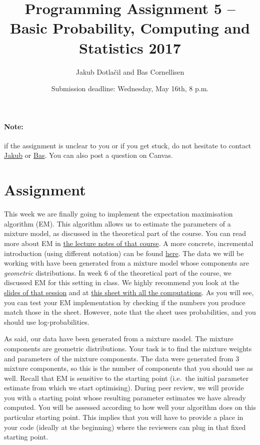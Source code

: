 \documentclass[11pt, a4paper]{article}
\title{Programming Assignment 5 -- Basic Probability, Computing and Statistics 2017}
\author{Jakub Dotla\v{c}il and Bas Cornellisen}
\date{Submission deadline: Wednesday, May 16th, 8 p.m.}
\begin{document}
\maketitle

\paragraph{Note:} if the assignment is unclear to you or if you get stuck, do not hesitate to contact \href{mailto:j.dotlacil@uva.nl}{Jakub} or \href{mailto:bjmcornelissen@gmail.com}{Bas}. You can also post a question on Canvas.

\section{Assignment}

This week we are finally going to implement the expectation maximisation algorithm (EM). 
This algorithm allows us to estimate the parameters of a mixture model, as discussed in the theoretical part of the course.
You can read more about EM in
\href{https://github.com/BasicProbability/LectureNotes/blob/master/chapter6/chapter6.pdf}{the lecture notes of that course}. 
A more concrete, incremental introduction (using different notation) can be found \href{https://canvas.uva.nl/courses/536/files/56289?module_item_id=20933}{here}.
The data we will be working with have been generated from a mixture model whose components are \emph{geometric} distributions.
In week 6 of the theoretical part of the course, we discussed EM for this setting in class. 
We highly recommend you look at the \href{https://canvas.uva.nl/courses/536/files/10975?module_item_id=8863}{slides of that session} and  at \href{https://docs.google.com/spreadsheets/d/1jlfex_GhObM_00iOnop4AEOW07pxVn1AGavOTcrAmBg}{this sheet with all the computations}.
As you will see, you can test your EM implementation by checking if the numbers you produce match those in the sheet. 
However, note that the sheet uses probabilities, and you should use log-probabilities.



As said, our data have been generated from a mixture model. 
 The mixture components are geometric distributions. 
 Your task is to find the mixture weights and parameters of the mixture components. 
 The data were generated from 3 mixture components, so this is the number of components that you should use as well. 
Recall that EM is sensitive to the starting point (i.e.\ the initial parameter estimate from which we start optimising). During peer review, we will
provide you with a starting point whose resulting parameter estimates we have already computed. You will be assessed according to how well your
algorithm does on this particular starting point. This implies that you will have to provide a place in your code (ideally at the beginning) where
the reviewers can plug in that fixed starting point.
\end{document}
